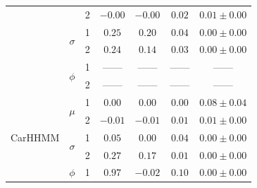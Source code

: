 \begin{table}
{\begin{tabular}{ccccccc}
                           &                               & 2                             & $-0.00$                         & $-0.00$                     & $0.02$                             & $0.01 \pm 0.00$                             \\
                           & \multirow{2}{*}{$\sigma$}     & 1                             & $0.25$                         & $0.20$                     & $0.04$                             & $0.00 \pm 0.00$                             \\
                           &                               & 2                             & $0.24$                         & $0.14$                     & $0.03$                             & $0.00 \pm 0.00$                             \\ 
                           & \multirow{2}{*}{$\phi$}       & 1                             & ------                         & ------                     & ------                             & ------                                      \\
                           &                               & 2                             & ------                         & ------                     & ------                             & ------                                      \\ \hline
\multirow{6}{*}{CarHHMM}   & \multirow{2}{*}{$\mu$}        & 1                             & $0.00$                         & $0.00$                     & $0.00$                             & $0.08 \pm 0.04$                             \\
                           &                               & 2                             & $-0.01$                         & $-0.01$                     & $0.01$                             & $0.01 \pm 0.00$                             \\
                           & \multirow{2}{*}{$\sigma$}     & 1                             & $0.05$                         & $0.00$                     & $0.04$                             & $0.00 \pm 0.00$                             \\
                           &                               & 2                             & $0.27$                         & $0.17$                     & $0.01$                             & $0.00 \pm 0.00$                             \\ 
                           & \multirow{2}{*}{$\phi$}       & 1                             & $0.97$                         & $-0.02$                     & $0.10$                             & $0.00 \pm 0.00$                             \\

\end{tabular}}
\end{table}
